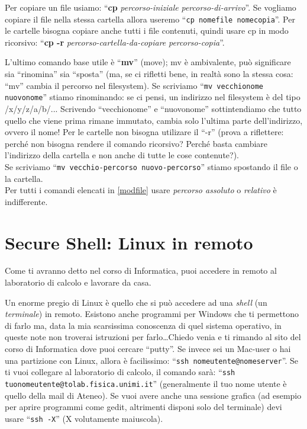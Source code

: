Per copiare un file usiamo: ``\textbf{cp} \emph{percorso-iniziale} \emph{percorso-di-arrivo}''. Se vogliamo copiare il file nella stessa cartella allora useremo ``\verb|cp nomefile nomecopia|''. Per le cartelle bisogna copiare anche tutti i file contenuti, quindi usare cp in modo ricorsivo: ``\textbf{cp -r} \emph{percorso-cartella-da-copiare} \emph{percorso-copia}''. 


L'ultimo comando base utile è ``\textbf{mv}'' (move); mv è ambivalente, può significare sia ``rinomina'' sia ``sposta'' (ma, se ci rifletti bene, in realtà sono la stessa cosa: ``mv'' cambia il percorso nel filesystem). Se scriviamo ``\verb|mv vecchionome nuovonome|'' stiamo rinominando: se ci pensi, un indirizzo nel filesystem è del tipo /x/y/z/a/b/... Scrivendo ``vecchionome'' e ``nuovonome'' sottintendiamo che tutto quello che viene prima rimane immutato, cambia solo l'ultima parte dell'indirizzo, ovvero il nome! Per le cartelle non bisogna utilizare il ``-r'' (prova a riflettere: perché non bisogna rendere il comando ricorsivo? Perché basta cambiare l'indirizzo della cartella e non anche di tutte le cose contenute?). \\
Se scriviamo ``\verb|mv vecchio-percorso nuovo-percorso|'' stiamo spostando il file o la cartella. \\

Per tutti i comandi elencati in \ref{modfile} usare \emph{percorso assoluto} o \emph{relativo} è indifferente. 

\section{Secure Shell: Linux in remoto}
Come ti avranno detto nel corso di Informatica, puoi accedere in remoto al laboratorio di calcolo e lavorare da casa. 

Un enorme pregio di Linux è quello che si può accedere ad una \emph{shell} (un \emph{terminale}) in remoto. Esistono anche programmi per Windows che ti permettono di farlo ma, data la mia scarsissima conoscenza di quel sistema operativo, in queste note non troverai  istruzioni per farlo\ldots Chiedo venia e ti rimando al sito del corso di Informatica dove puoi cercare ``putty''.
Se invece sei un Mac-user o hai una partizione con Linux, allora è facilissimo: ``\verb|ssh nomeutente@nomeserver|''. Se ti vuoi collegare al laboratorio di calcolo, il comando sarà: ``\verb|ssh tuonomeutente@tolab.fisica.unimi.it|'' (generalmente il tuo nome utente è quello della mail di Ateneo). Se vuoi avere anche una sessione grafica (ad esempio per aprire programmi come gedit, altrimenti disponi solo del terminale) devi usare ``\verb|ssh -X|'' (X volutamente maiuscola).

